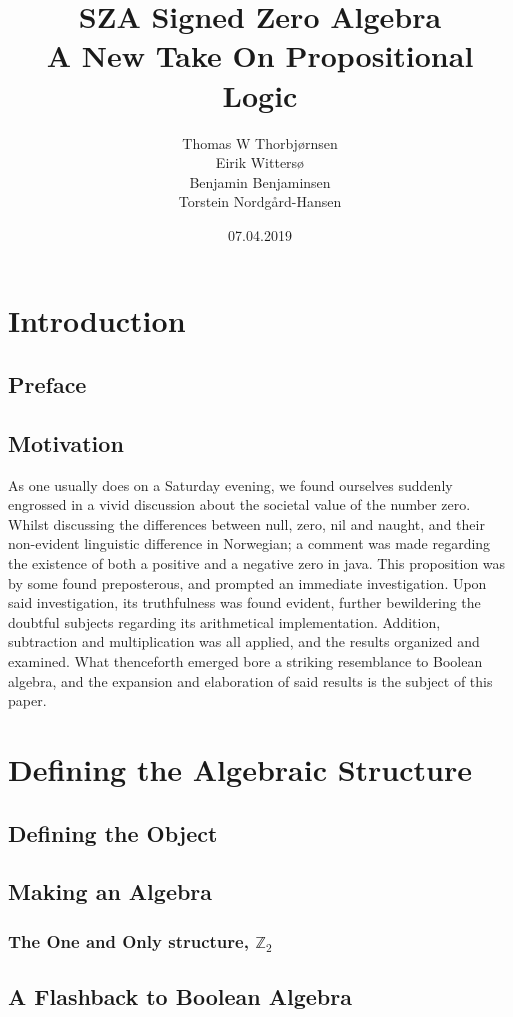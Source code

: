 \documentclass[12pt]{report}
\title{\Huge SZA Signed Zero Algebra \\
       \Large A New Take On Propositional Logic}
\author{{Thomas W Thorbjørnsen} \\
        {Eirik Wittersø}\\
        {Benjamin Benjaminsen}\\
        {Torstein Nordgård-Hansen}}
\date{07.04.2019}
\begin{document}
\maketitle
\large
\tableofcontents
\newpage

\chapter{Introduction}
  \section{Preface}
  \section{Motivation}
    As one usually does on a Saturday evening,
    we found ourselves suddenly engrossed in a vivid discussion
    about the societal value of the number zero.
    Whilst discussing the differences between null, zero, nil and naught,
    and their non-evident linguistic difference in Norwegian;
    a comment was made regarding the existence of both a positive and a negative zero in java.
    This proposition was by some found preposterous, and prompted an immediate investigation.
    Upon said investigation, its truthfulness was found evident, further bewildering the doubtful subjects
    regarding its arithmetical implementation.
    Addition, subtraction and multiplication was all applied, and the results organized and examined.
    What thenceforth emerged bore a striking resemblance to Boolean algebra,
    and the expansion and elaboration of said results is the subject of this paper.

\chapter{Defining the Algebraic Structure}
  \section{Defining the Object}
  \section{Making an Algebra}
  \subsection{The One and Only structure, $\mathbb{Z}_2$}
  \section{A Flashback to Boolean Algebra}
\end{document}
